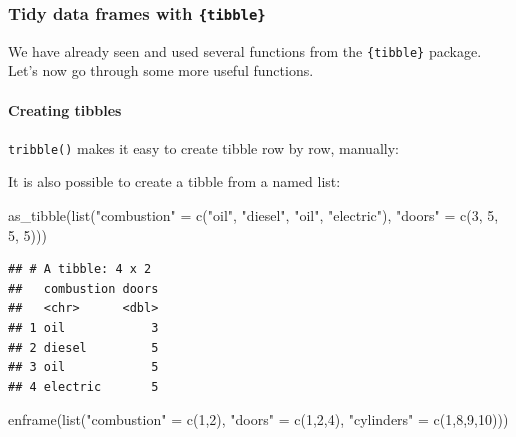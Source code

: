 \documentclass[
]{article}
\newenvironment{Shaded}{\begin{snugshade}}{\end{snugshade}}
\newcommand{\DecValTok}[1]{\textcolor[rgb]{0.00,0.00,0.81}{#1}}
\newcommand{\FunctionTok}[1]{\textcolor[rgb]{0.00,0.00,0.00}{#1}}
\newcommand{\NormalTok}[1]{#1}
\newcommand{\OtherTok}[1]{\textcolor[rgb]{0.56,0.35,0.01}{#1}}
\newcommand{\StringTok}[1]{\textcolor[rgb]{0.31,0.60,0.02}{#1}}
\begin{document}
\hypertarget{tidy-data-frames-with-tibble}{%
\subsubsection{\texorpdfstring{Tidy data frames with \texttt{\{tibble\}}}{Tidy data frames with \{tibble\}}}\label{tidy-data-frames-with-tibble}}

We have already seen and used several functions from the \texttt{\{tibble\}} package. Let's now go through
some more useful functions.

\hypertarget{creating-tibbles}{%
\paragraph{Creating tibbles}\label{creating-tibbles}}

\texttt{tribble()} makes it easy to create tibble row by row, manually:

It is also possible to create a tibble from a named list:

\begin{Shaded}
\begin{Highlighting}[]
\FunctionTok{as\_tibble}\NormalTok{(}\FunctionTok{list}\NormalTok{(}\StringTok{"combustion"} \OtherTok{=} \FunctionTok{c}\NormalTok{(}\StringTok{"oil"}\NormalTok{, }\StringTok{"diesel"}\NormalTok{, }\StringTok{"oil"}\NormalTok{, }\StringTok{"electric"}\NormalTok{),}
               \StringTok{"doors"} \OtherTok{=} \FunctionTok{c}\NormalTok{(}\DecValTok{3}\NormalTok{, }\DecValTok{5}\NormalTok{, }\DecValTok{5}\NormalTok{, }\DecValTok{5}\NormalTok{)))}
\end{Highlighting}
\end{Shaded}

\begin{verbatim}
## # A tibble: 4 x 2
##   combustion doors
##   <chr>      <dbl>
## 1 oil            3
## 2 diesel         5
## 3 oil            5
## 4 electric       5
\end{verbatim}

\begin{Shaded}
\begin{Highlighting}[]
\FunctionTok{enframe}\NormalTok{(}\FunctionTok{list}\NormalTok{(}\StringTok{"combustion"} \OtherTok{=} \FunctionTok{c}\NormalTok{(}\DecValTok{1}\NormalTok{,}\DecValTok{2}\NormalTok{), }\StringTok{"doors"} \OtherTok{=} \FunctionTok{c}\NormalTok{(}\DecValTok{1}\NormalTok{,}\DecValTok{2}\NormalTok{,}\DecValTok{4}\NormalTok{), }\StringTok{"cylinders"} \OtherTok{=} \FunctionTok{c}\NormalTok{(}\DecValTok{1}\NormalTok{,}\DecValTok{8}\NormalTok{,}\DecValTok{9}\NormalTok{,}\DecValTok{10}\NormalTok{)))}
\end{Highlighting}
\end{Shaded}
\end{document}
